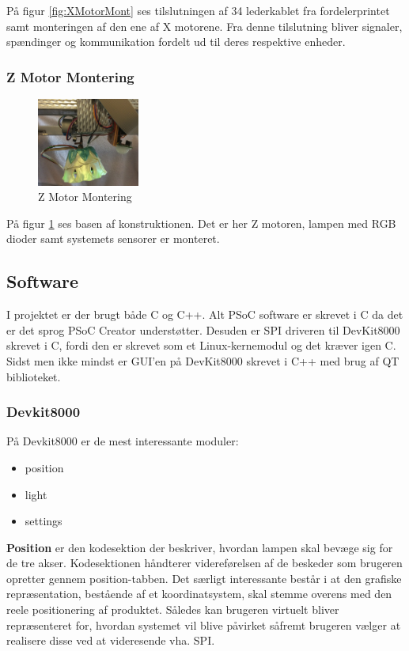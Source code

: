 På figur \ref{fig:XMotorMont} ses tilslutningen af 34 lederkablet fra fordelerprintet samt monteringen af den ene af X motorene. Fra denne tilslutning bliver signaler, spændinger og kommunikation fordelt ud til deres respektive enheder.

\subsubsection{Z Motor Montering}
\begin{figure}[H] \centering
    \includegraphics[width=0.3\textwidth]{Filer/ZMotorMont.PNG}
    \caption{Z Motor Montering}
    \label{fig:ZMotorMont}
\end{figure}

På figur \ref{fig:ZMotorMont} ses basen af konstruktionen. Det er her Z motoren, lampen med RGB dioder samt systemets sensorer er monteret.

\subsection{Software}

I projektet er der brugt både C og C++. Alt PSoC software er skrevet i C da det er det sprog PSoC Creator understøtter. Desuden er SPI driveren til DevKit8000 skrevet i C, fordi den er skrevet som et Linux-kernemodul og det kræver igen C. Sidst men ikke mindst er GUI'en på DevKit8000 skrevet i C++ med brug af QT biblioteket.

\subsubsection{Devkit8000}

På Devkit8000 er de mest interessante moduler:

\begin{itemize}
	\item position
	\item light
	\item settings
\end{itemize}

\textbf{Position} er den kodesektion der beskriver, hvordan lampen skal bevæge sig for de tre akser. Kodesektionen håndterer videreførelsen af de beskeder som brugeren opretter gennem position-tabben. Det særligt interessante består i at den grafiske repræsentation, bestående af et koordinatsystem, skal stemme overens med den reele positionering af produktet. Således kan brugeren virtuelt bliver repræsenteret for, hvordan systemet vil blive påvirket såfremt brugeren vælger at realisere disse ved at videresende vha. SPI.


